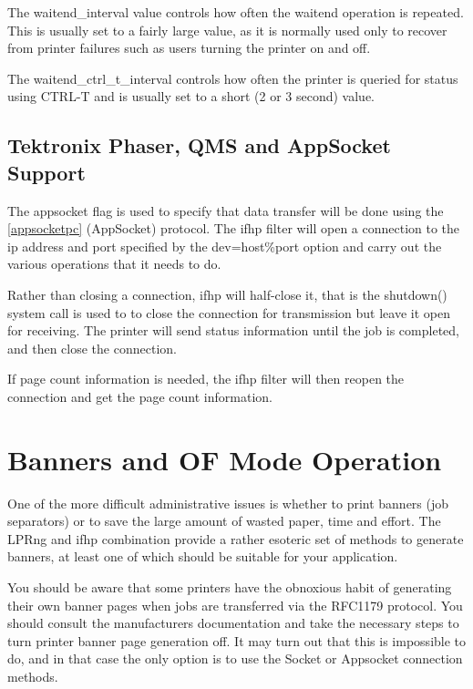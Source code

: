 \documentclass[a4paper]{article}
\begin{document}
The {\ttfamily waitend\_interval}
value controls how often the waitend operation is repeated.
This is usually set to a fairly large value,
as it is normally used only to recover from printer failures
such as users turning the printer on and off.

The {\ttfamily waitend\_ctrl\_t\_interval}
controls how often the printer is queried for status using CTRL-T
and is usually set to a short (2 or 3 second) value.




\subsection{Tektronix Phaser, QMS and AppSocket Support
\label{appsocket}}

The {\ttfamily appsocket} flag is used to specify that data transfer will
be done using the
\ref{appsocketpc} {(AppSocket)}
protocol.
The {\ttfamily ifhp} filter will open a connection to the ip address and
port specified by the {\ttfamily dev=host\%port} option
and carry out the various operations that it needs to do.

Rather than closing a connection,
{\ttfamily ifhp} will {\ttfamily half-close} it,
that is the {\ttfamily shutdown()} system call is used to
to close the connection for transmission but leave it open for receiving.
The printer will send status information until the job is completed,
and then close the connection.

If page count information is needed,
the {\ttfamily ifhp} filter will then reopen the connection and get the page count information.


\section{Banners and OF Mode Operation}

One of the more difficult administrative issues is whether to print
banners (job separators) or to save the large amount of wasted
paper, time and effort.
The LPRng and
{\ttfamily ifhp}
combination provide a rather esoteric set of methods to generate banners,
at least one of which should be suitable for your application.

You should be aware that some printers have the obnoxious habit of
generating their own banner pages when jobs are transferred via
the RFC1179 protocol.
You should consult the manufacturers documentation and take the
necessary steps to turn printer banner page generation off.
It may turn out that this is impossible to do,
and in that case the only option is to use the Socket or Appsocket
connection methods.
\end{document}
